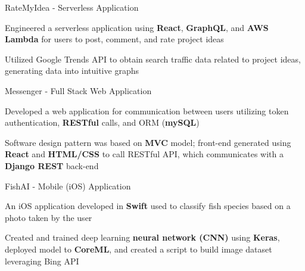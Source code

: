 \begin{siderulesProj}
\par\addvspace{-1.2ex}
\begin{cventriesproject}
  \cventryproject
  {RateMyIdea - Serverless Application}
  {
    \begin{cvskillitems}
      \item {Engineered a serverless application using \textbf{React}, \textbf{GraphQL}, and \textbf{AWS Lambda} for users to post, comment, and rate project ideas }
      \item {Utilized Google Trends API to obtain search traffic data related to project ideas, generating data into intuitive graphs}
    \end{cvskillitems}
  }
  \cventryproject
    {Messenger - Full Stack Web Application}
    {
      \begin{cvskillitems}
        \item {Developed a web application for communication between users utilizing token authentication, \textbf{RESTful} calls, and ORM (\textbf{mySQL})}
        \item {Software design pattern was based on \textbf{MVC} model; front-end generated using \textbf{React} and \textbf{HTML/CSS} to call RESTful API, which communicates with a \textbf{Django REST} back-end}
      \end{cvskillitems}
    }
  \cventryproject
    {FishAI - Mobile (iOS) Application}
    {
      \begin{cvskillitems}
        \item {An iOS application developed in \textbf{Swift} used to classify fish species based on a photo taken by the user}
        \item {Created and trained deep learning \textbf{neural network (CNN)} using \textbf{Keras}, deployed model to \textbf{CoreML}, and created a script to build image dataset leveraging Bing API}
      \end{cvskillitems}
    }
\end{cventriesproject}
\end{siderulesProj}
